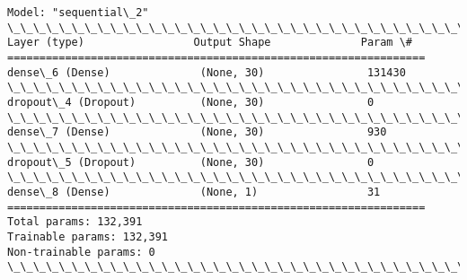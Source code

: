 \documentclass[11pt]{article}
\begin{document}
    \begin{Verbatim}[commandchars=\\\{\}]
Model: "sequential\_2"
\_\_\_\_\_\_\_\_\_\_\_\_\_\_\_\_\_\_\_\_\_\_\_\_\_\_\_\_\_\_\_\_\_\_\_\_\_\_\_\_\_\_\_\_\_\_\_\_\_\_\_\_\_\_\_\_\_\_\_\_\_\_\_\_\_
Layer (type)                 Output Shape              Param \#
=================================================================
dense\_6 (Dense)              (None, 30)                131430
\_\_\_\_\_\_\_\_\_\_\_\_\_\_\_\_\_\_\_\_\_\_\_\_\_\_\_\_\_\_\_\_\_\_\_\_\_\_\_\_\_\_\_\_\_\_\_\_\_\_\_\_\_\_\_\_\_\_\_\_\_\_\_\_\_
dropout\_4 (Dropout)          (None, 30)                0
\_\_\_\_\_\_\_\_\_\_\_\_\_\_\_\_\_\_\_\_\_\_\_\_\_\_\_\_\_\_\_\_\_\_\_\_\_\_\_\_\_\_\_\_\_\_\_\_\_\_\_\_\_\_\_\_\_\_\_\_\_\_\_\_\_
dense\_7 (Dense)              (None, 30)                930
\_\_\_\_\_\_\_\_\_\_\_\_\_\_\_\_\_\_\_\_\_\_\_\_\_\_\_\_\_\_\_\_\_\_\_\_\_\_\_\_\_\_\_\_\_\_\_\_\_\_\_\_\_\_\_\_\_\_\_\_\_\_\_\_\_
dropout\_5 (Dropout)          (None, 30)                0
\_\_\_\_\_\_\_\_\_\_\_\_\_\_\_\_\_\_\_\_\_\_\_\_\_\_\_\_\_\_\_\_\_\_\_\_\_\_\_\_\_\_\_\_\_\_\_\_\_\_\_\_\_\_\_\_\_\_\_\_\_\_\_\_\_
dense\_8 (Dense)              (None, 1)                 31
=================================================================
Total params: 132,391
Trainable params: 132,391
Non-trainable params: 0
\_\_\_\_\_\_\_\_\_\_\_\_\_\_\_\_\_\_\_\_\_\_\_\_\_\_\_\_\_\_\_\_\_\_\_\_\_\_\_\_\_\_\_\_\_\_\_\_\_\_\_\_\_\_\_\_\_\_\_\_\_\_\_\_\_
    \end{Verbatim}
\end{document}
